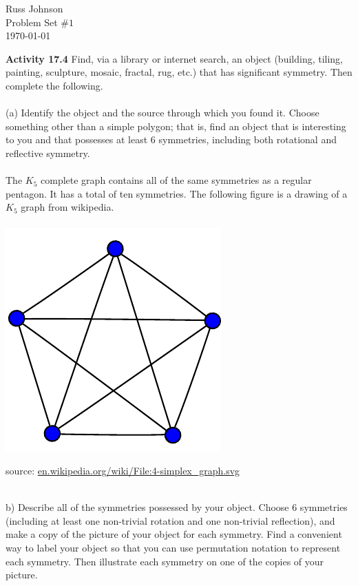 \documentclass[11pt,a4paper]{article}
\begin{document}
\begin{flushright}
Russ Johnson\\
Problem Set $\#1$\\
\today\\
\end{flushright}

{\bf Activity 17.4} Find, via a library or internet search, an object (building, tiling,
painting, sculpture, mosaic, fractal, rug, etc.) that has significant symmetry. Then
complete the following.\\
~\\
(a) Identify the object and the source through which you found it. Choose something other than a simple polygon; that is, find an object that is interesting to you and that possesses at least 6 symmetries, including both rotational and reflective symmetry.\\
~\\
The $K_5$ complete graph contains all of the same symmetries as a regular pentagon. It has a total of ten symmetries. The following figure is a drawing of a $K_5$ graph from wikipedia. \\
~\\
\includegraphics[scale=1]{./graphics/4-simplex_graph.pdf}
\begin{flushright}
source: \url{en.wikipedia.org/wiki/File:4-simplex_graph.svg}
\end{flushright}
~\\
b) Describe all of the symmetries possessed by your object. Choose 6 symmetries (including at least one non-trivial rotation and one non-trivial reflection), and make a copy of the picture of your object for each symmetry.
Find a convenient way to label your object so that you can use permutation notation to represent each symmetry. Then illustrate each symmetry on one of the copies of your picture.\\
\end{document}
